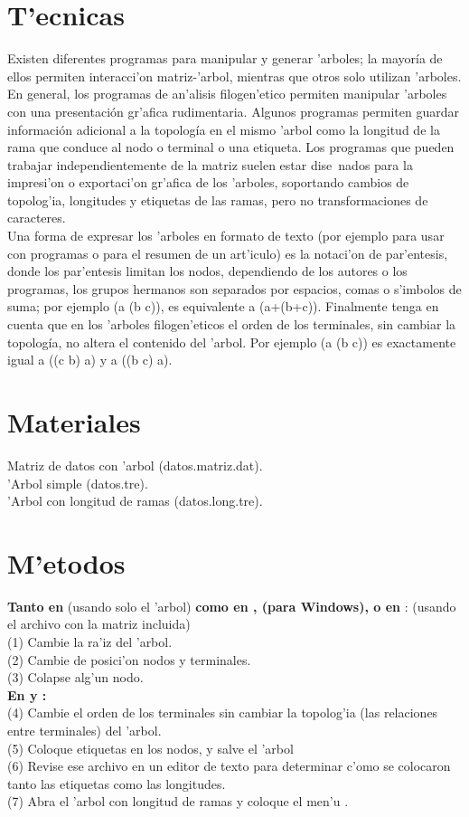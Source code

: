 \section{T'ecnicas}
Existen diferentes programas para manipular y generar 'arboles; la mayor\'ia de ellos permiten interacci'on matriz-'arbol, mientras que otros solo utilizan 'arboles. En general, los programas de an'alisis filogen'etico permiten manipular 'arboles con una presentaci\'on gr'afica rudimentaria. Algunos programas permiten guardar informaci\'on adicional a la topolog\'ia en el mismo 'arbol como la longitud de la rama que conduce al nodo o terminal o una etiqueta. Los programas que pueden trabajar independientemente de la matriz suelen estar dise~nados para la impresi'on o exportaci'on gr'afica de los 'arboles, soportando cambios de topolog'ia, longitudes y etiquetas de las ramas, pero no transformaciones de caracteres.
\\
Una forma de expresar los 'arboles en formato de texto (por ejemplo para usar con programas o para el resumen de un art'iculo) es la notaci'on de par'entesis, donde  los par'entesis limitan los nodos, dependiendo de los autores o los programas, los grupos hermanos son separados por espacios, comas o s'imbolos de suma; por ejemplo (a (b c)), es equivalente a (a+(b+c)). Finalmente tenga en cuenta que en los 'arboles filogen'eticos el orden de los terminales, sin cambiar la topolog\'ia, no altera el contenido del 'arbol. Por ejemplo (a (b c)) es exactamente igual a ((c b) a) y a ((b c) a).
\\
\section{Materiales}
\noindent
Matriz de datos con 'arbol (datos.matriz.dat).\\
'Arbol simple (datos.tre).\\
'Arbol con longitud de ramas (datos.long.tre).
\section{M'etodos}
\noindent
\textbf{Tanto en } (usando solo el 'arbol) \textbf{como en ,  (para Windows),  o en }: (usando el archivo con la matriz incluida)\\
(1) Cambie la ra'iz del 'arbol.\\
(2) Cambie de posici'on nodos y terminales.\\
(3) Colapse alg'un nodo.\\
\textbf{En  y :}\\
(4) Cambie el orden de los terminales sin cambiar la topolog'ia (las relaciones entre terminales) del 'arbol.\\
(5) Coloque etiquetas en los nodos, y salve el 'arbol\\
(6) Revise ese archivo en un editor de texto para determinar c'omo se colocaron tanto las etiquetas como las longitudes.\\
(7) Abra el 'arbol con longitud de ramas y coloque el men'u .
